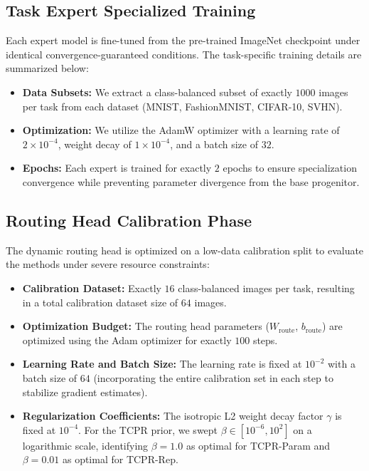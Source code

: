 \documentclass{article}
\theoremstyle{plain}
\theoremstyle{definition}
\theoremstyle{remark}
\begin{document}
\subsection{Task Expert Specialized Training}
Each expert model is fine-tuned from the pre-trained ImageNet checkpoint under identical convergence-guaranteed conditions. The task-specific training details are summarized below:
\begin{itemize}
    \item \textbf{Data Subsets:} We extract a class-balanced subset of exactly $1000$ images per task from each dataset (MNIST, FashionMNIST, CIFAR-10, SVHN).
    \item \textbf{Optimization:} We utilize the AdamW optimizer with a learning rate of $2 \times 10^{-4}$, weight decay of $1 \times 10^{-4}$, and a batch size of $32$.
    \item \textbf{Epochs:} Each expert is trained for exactly $2$ epochs to ensure specialization convergence while preventing parameter divergence from the base progenitor.
\end{itemize}

\subsection{Routing Head Calibration Phase}
The dynamic routing head is optimized on a low-data calibration split to evaluate the methods under severe resource constraints:
\begin{itemize}
    \item \textbf{Calibration Dataset:} Exactly $16$ class-balanced images per task, resulting in a total calibration dataset size of $64$ images.
    \item \textbf{Optimization Budget:} The routing head parameters ($W_{\text{route}}$, $b_{\text{route}}$) are optimized using the Adam optimizer for exactly $100$ steps.
    \item \textbf{Learning Rate and Batch Size:} The learning rate is fixed at $10^{-2}$ with a batch size of $64$ (incorporating the entire calibration set in each step to stabilize gradient estimates).
    \item \textbf{Regularization Coefficients:} The isotropic L2 weight decay factor $\gamma$ is fixed at $10^{-4}$. For the TCPR prior, we swept $\beta \in [10^{-6}, 10^2]$ on a logarithmic scale, identifying $\beta = 1.0$ as optimal for TCPR-Param and $\beta = 0.01$ as optimal for TCPR-Rep.
\end{itemize}
\end{document}
